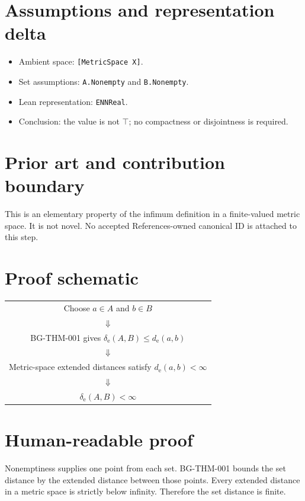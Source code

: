 \documentclass[11pt]{article}
\begin{document}
\section{Assumptions and representation delta}

\begin{itemize}
 \item Ambient space: \texttt{[MetricSpace X]}.
 \item Set assumptions: \texttt{A.Nonempty} and \texttt{B.Nonempty}.
 \item Lean representation: \texttt{ENNReal}.
 \item Conclusion: the value is not $\top$; no compactness or disjointness is required.
\end{itemize}

\section{Prior art and contribution boundary}

This is an elementary property of the infimum definition in a finite-valued metric space.
It is not novel. No accepted References-owned canonical ID is attached to this step.

\section{Proof schematic}

\begin{center}
\begin{tabular}{c}
Choose $a\in A$ and $b\in B$ \\
$\Downarrow$ \\
BG-THM-001 gives $\delta_{\mathrm e}(A,B)\le d_{\mathrm e}(a,b)$ \\
$\Downarrow$ \\
Metric-space extended distances satisfy $d_{\mathrm e}(a,b)<\infty$ \\
$\Downarrow$ \\
$\delta_{\mathrm e}(A,B)<\infty$
\end{tabular}
\end{center}

\section{Human-readable proof}

Nonemptiness supplies one point from each set. BG-THM-001 bounds the set distance by the
extended distance between those points. Every extended distance in a metric space is
strictly below infinity. Therefore the set distance is finite.
\end{document}
